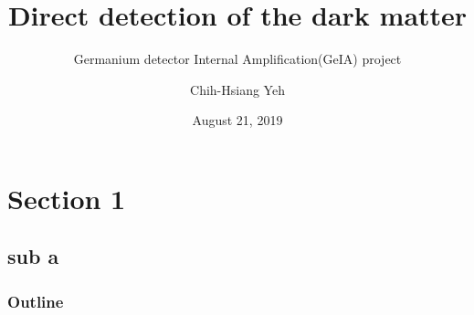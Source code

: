 \documentclass{beamer}
\title{Direct detection of the dark matter}
\subtitle{Germanium detector Internal Amplification(GeIA) project }
\author{Chih-Hsiang Yeh}
\institute{Institute of Physics, Academic Sinica (IoPAS)}
\date{ August 21, 2019}
\begin{document}
\begin{frame}
\titlepage
\end{frame}
\section{Section 1}
\subsection{sub a}

\begin{frame}
\frametitle{Outline}
\end{frame}
\end{document}
